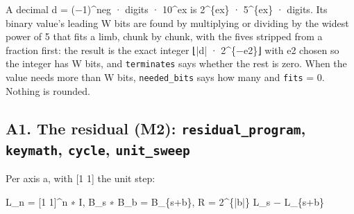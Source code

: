 A decimal d = (−1)\textasciicircum{}neg · digits · 10\textasciicircum{}ex is 2\textasciicircum{}\{ex\} · 5\textasciicircum{}\{ex\} · digits. Its binary value's leading W bits are found by multiplying or dividing by the widest power of 5 that fits a limb, chunk by chunk, with the fives stripped from a fraction first: the result is the exact integer ⌊|d| · 2\textasciicircum{}\{−e2\}⌋ with e2 chosen so the integer has W bits, and \texttt{terminates} says whether the rest is zero. When the value needs more than W bits, \texttt{needed\_\allowbreak{}bits} says how many and \texttt{fits} = 0. Nothing is rounded.

\subsection{\texorpdfstring{A1. The residual (M2): \texttt{residual\_\allowbreak{}program}, \texttt{keymath}, \texttt{cycle}, \texttt{unit\_\allowbreak{}sweep}}{A1. The residual (M2): residual\_program, keymath, cycle, unit\_sweep}}

Per axis a, with [1 1] the unit step:

L\_\allowbreak{}n = [1 1]\textasciicircum{}n ∗ I,  B\_\allowbreak{}s ∗ B\_\allowbreak{}b = B\_\allowbreak{}\{s+b\},  R = 2\textasciicircum{}\{|b|\} L\_\allowbreak{}s − L\_\allowbreak{}\{s+b\}

